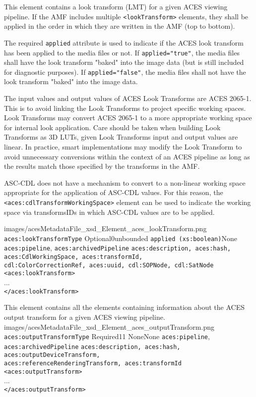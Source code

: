         {This element contains a look transform (LMT) for a given ACES viewing pipeline.  If the AMF includes multiple \texttt{<lookTransform>} elements, they shall be applied in the order in which they are written in the AMF (top to bottom).

        The required \texttt{applied} attribute is used to indicate if the ACES look transform has been applied to the media files or not.  If \texttt{applied="true"}, the media files shall have the look transform "baked" into the image data (but is still included for diagnostic purposes). If \texttt{applied="false"}, the media files shall not have the look transform "baked" into the image data.

        The input values and output values of ACES Look Transforms are ACES 2065-1. This is to avoid linking the Look Transforms to project specific working spaces. Look Transforms may convert ACES 2065-1 to a more appropriate working space for internal look application. Care should be taken when building Look Transforms as 3D LUTs, given Look Transforms input and output values are linear. In practice, smart implementations may modify the Look Transform to avoid unnecessary conversions within the context of an ACES pipeline as long as the results match those specified by the transforms in the AMF.

        ASC-CDL does not have a mechanism to convert to a non-linear working space appropriate for the application of ASC-CDL values. For this reason, the \texttt{<aces:cdlTransformWorkingSpace>} element can be used to indicate the working space via transformsIDs in which ASC-CDL values are to be applied.}
        {images/acesMetadataFile_xsd_Element_aces_lookTransform.png}
        {\texttt{aces:lookTransformType}}
        {Optional}{0}{unbounded}
        {\texttt{applied (xs:boolean)}}{None}
        {\texttt{aces:pipeline}, \texttt{aces:archivedPipeline}}
        {\texttt{aces:description, aces:hash, aces:CdlWorkingSpace, aces:transformId,\\  cdl:ColorCorrectionRef, aces:uuid, cdl:SOPNode, cdl:SatNode}}
        {\lstinline{<aces:lookTransform>} \\
        ... \\
        \lstinline{</aces:lookTransform>}}

        {This element contains all the elements containing information about the ACES output transform for a given ACES viewing pipeline.}
        {images/acesMetadataFile_xsd_Element_aces_outputTransform.png}
        {\texttt{aces:outputTransformType}}
        {Required}{1}{1}
        {None}{None}
        {\texttt{aces:pipeline}, \texttt{aces:archivedPipeline}}
        {\texttt{aces:description, aces:hash, aces:outputDeviceTransform, \\
        aces:referenceRenderingTransform, aces:transformId}}
        {\lstinline{<aces:outputTransform>} \\
        ... \\
        \lstinline{</aces:outputTransform>}}

